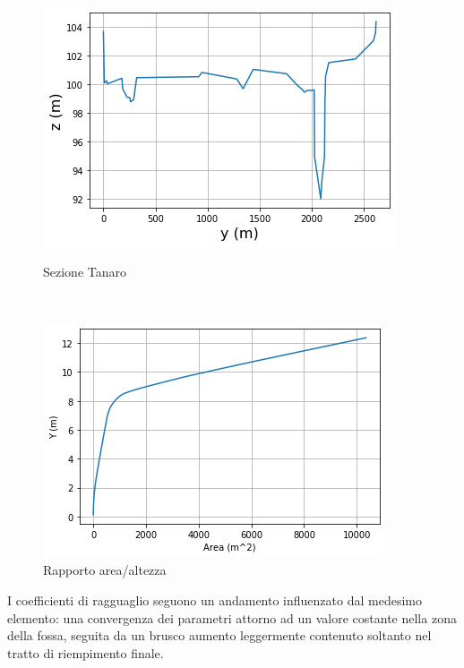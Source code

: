 \documentclass[12pt]{article} %
\begin{document}
\begin{figure}[H]
\begin{minipage}[b]{8.5cm}
\centering
    \includegraphics[width=1 \textwidth]{sezioneta.png}
    \caption{Sezione Tanaro}
    \label{fig:Tanaro_sezione}
\end{minipage}
\ \hspace{2mm} \hspace{3mm} \
\begin{minipage}[b]{8.5cm}
    \centering
    \includegraphics[width=1 \textwidth]{rapporto area altezzata.png}
    \caption{Rapporto area/altezza}
    \label{fig:Tanaro_area/altezza}
\end{minipage}
\end{figure}

\noindent I coefficienti di ragguaglio seguono un andamento influenzato dal medesimo elemento: una convergenza dei parametri attorno ad un valore costante nella zona della fossa, seguita da un brusco aumento leggermente contenuto soltanto nel tratto di riempimento finale.
\end{document}
